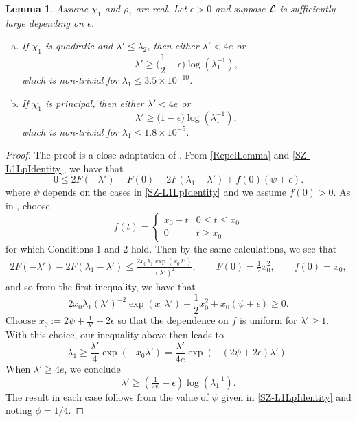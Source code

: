 \documentclass[12pt,psamsfonts]{amsart}
\newtheorem{lem}[thm]{Lemma}
\theoremstyle{definition}
\theoremstyle{remark}
\numberwithin{equation}{section}
\begin{document}
\begin{lem} \label{SZ-L1Lp_verysmall} Assume $\chi_1$ and $\rho_1$ are real. Let $\epsilon > 0$ and suppose $\mathcal{L}$ is sufficiently large depending on $\epsilon$.

\begin{enumerate}[(a)]
	\item If $\chi_1$ is quadratic and $\lambda' \leq \lambda_2$, then either $\lambda' < 4e$ or 
	\[
	\lambda' \geq \Big(\frac{1}{2} - \epsilon\Big) \log(\lambda_1^{-1}), 
	\]
	which is non-trivial for $\lambda_1 \leq 3.5 \times 10^{-10}$. 
	\item If $\chi_1$ is principal, then either $\lambda' < 4e$ or
	\[
	\lambda' \geq \big(1 - \epsilon\big) \log(\lambda_1^{-1}),
	\]
	which is non-trivial for $\lambda_1 \leq 1.8 \times 10^{-5}$. 
\end{enumerate}
\end{lem}
\begin{proof} The proof is a close adaptation of \cite[p. 37]{HBLinnik}. 
From \cref{RepelLemma} and \cref{SZ-L1LpIdentity}, we have that
\[
0 \leq 2F(-\lambda') - F(0) - 2F(\lambda_1-\lambda') + f(0)(\psi+\epsilon).
\]
where $\psi$ depends on the cases in \cref{SZ-L1LpIdentity} and we assume $f(0) > 0$. As in \cite[p. 37]{HBLinnik}, choose 
\[
f(t) = \begin{cases} x_0 - t & 0 \leq t \leq x_0 \\
0 & t \geq x_0
\end{cases}
\]
for which Conditions 1 and 2 hold. Then by the same calculations, we see that
\begin{align*}
 2F(-\lambda') - 2F(\lambda_1-\lambda') \leq  \frac{2x_0 \lambda_1 \exp(x_0 \lambda')}{(\lambda')^2}, \qquad F(0) = \tfrac{1}{2} x_0^2, \qquad 
 f(0) = x_0,
\end{align*}
and so from the first inequality, we have that
\[
2x_0\lambda_1(\lambda')^{-2} \exp(x_0\lambda') - \frac{1}{2}x_0^2 + x_0(\psi+\epsilon) \geq 0. 
\]
Choose $x_0 := 2\psi + \frac{1}{\lambda'} + 2\epsilon$ so that the dependence on $f$ is uniform for $\lambda' \geq 1$. With this choice, our inequality above then leads to
\[
\lambda_1 \geq \frac{\lambda'}{4} \exp(-x_0 \lambda') = \frac{\lambda'}{4e} \exp(-(2\psi+2\epsilon) \lambda'). 
\]
When $\lambda' \geq 4e$, we conclude
\[
\lambda' \geq (\tfrac{1}{2\psi}-\epsilon) \log(\lambda_1^{-1}).
\]
The result in each case follows from the value of $\psi$ given in \cref{SZ-L1LpIdentity} and noting $\phi = 1/4$. 
\end{proof}
\end{document}
